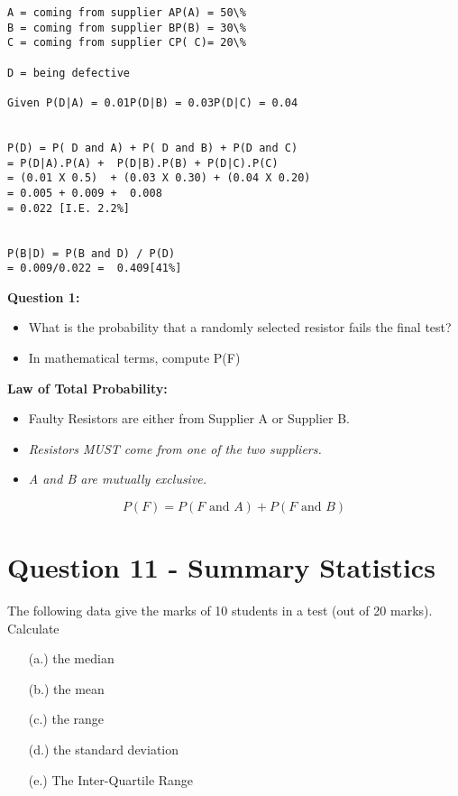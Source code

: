 \documentclass[]{report}
\begin{document}
\begin{verbatim}
A = coming from supplier AP(A) = 50\%
B = coming from supplier BP(B) = 30\%
C = coming from supplier CP( C)= 20\%

D = being defective

Given P(D|A) = 0.01P(D|B) = 0.03P(D|C) = 0.04


P(D) = P( D and A) + P( D and B) + P(D and C)
= P(D|A).P(A) +  P(D|B).P(B) + P(D|C).P(C)
= (0.01 X 0.5)  + (0.03 X 0.30) + (0.04 X 0.20)
= 0.005 + 0.009 +  0.008
= 0.022 [I.E. 2.2%]


P(B|D) = P(B and D) / P(D)  
= 0.009/0.022 =  0.409[41%]
\end{verbatim}



\newpage
\textbf{Question 1:}
\begin{itemize}
\item What is the probability that a randomly selected resistor fails the final test?

\item In mathematical terms, compute P(F) 
\end{itemize}


\textbf{Law of Total Probability:}
\begin{itemize}
\item Faulty Resistors are either from Supplier A or Supplier B.
\vspace{0.3cm} 
\item \textit{Resistors MUST come from one of the two suppliers.}
\item \textit{A and B are mutually exclusive.}
\end{itemize}
\vspace{0.3cm} 
\[ P(F) = P(F \mbox{ and } A) + P(F \mbox{ and } B) \]






\section*{Question 11 - Summary Statistics}

The following data give the marks of 10 students in a test (out of 20 marks). Calculate
\begin{itemize}   
\item[(a.)] the median    
\item[(b.)] the mean     
\item[(c.)] the range    
\item[(d.)] the standard deviation 
\item[(e.)] The Inter-Quartile Range
\end{itemize}
\end{document}

